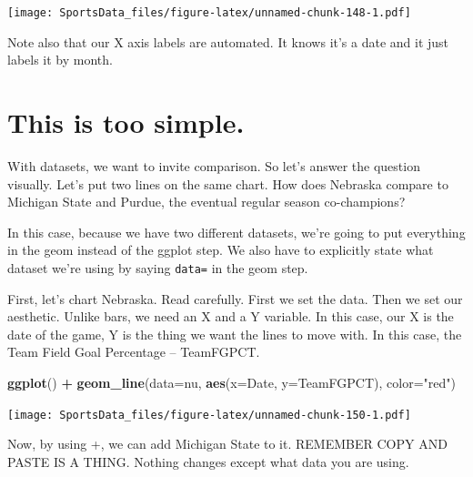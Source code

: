 \documentclass[
]{book}
\newenvironment{Shaded}{\begin{snugshade}}{\end{snugshade}}
\newcommand{\DataTypeTok}[1]{\textcolor[rgb]{0.13,0.29,0.53}{#1}}
\newcommand{\KeywordTok}[1]{\textcolor[rgb]{0.13,0.29,0.53}{\textbf{#1}}}
\newcommand{\NormalTok}[1]{#1}
\newcommand{\OperatorTok}[1]{\textcolor[rgb]{0.81,0.36,0.00}{\textbf{#1}}}
\newcommand{\StringTok}[1]{\textcolor[rgb]{0.31,0.60,0.02}{#1}}
\begin{document}
\texttt{[image: SportsData\_files/figure-latex/unnamed-chunk-148-1.pdf]}

Note also that our X axis labels are automated. It knows it's a date and it just labels it by month.

\hypertarget{this-is-too-simple.}{%
\section{This is too simple.}\label{this-is-too-simple.}}

With datasets, we want to invite comparison. So let's answer the question visually. Let's put two lines on the same chart. How does Nebraska compare to Michigan State and Purdue, the eventual regular season co-champions?

\begin{Shaded}
\end{Shaded}

In this case, because we have two different datasets, we're going to put everything in the geom instead of the ggplot step. We also have to explicitly state what dataset we're using by saying \texttt{data=} in the geom step.

First, let's chart Nebraska. Read carefully. First we set the data. Then we set our aesthetic. Unlike bars, we need an X and a Y variable. In this case, our X is the date of the game, Y is the thing we want the lines to move with. In this case, the Team Field Goal Percentage -- TeamFGPCT.

\begin{Shaded}
\begin{Highlighting}[]
\KeywordTok{ggplot}\NormalTok{() }\OperatorTok{+}\StringTok{ }\KeywordTok{geom_line}\NormalTok{(}\DataTypeTok{data=}\NormalTok{nu, }\KeywordTok{aes}\NormalTok{(}\DataTypeTok{x=}\NormalTok{Date, }\DataTypeTok{y=}\NormalTok{TeamFGPCT), }\DataTypeTok{color=}\StringTok{"red"}\NormalTok{)}
\end{Highlighting}
\end{Shaded}

\texttt{[image: SportsData\_files/figure-latex/unnamed-chunk-150-1.pdf]}

Now, by using +, we can add Michigan State to it. REMEMBER COPY AND PASTE IS A THING. Nothing changes except what data you are using.
\end{document}
